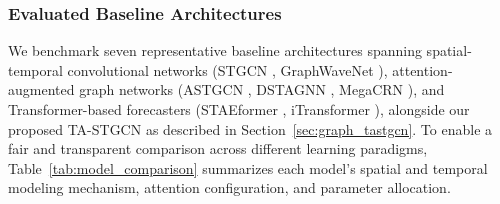 \documentclass[a4paper,fleqn]{cas-sc}
\begin{document}
\subsubsection{Evaluated Baseline Architectures}
We benchmark seven representative baseline architectures spanning spatial-temporal convolutional networks (STGCN \cite{stgcn}, GraphWaveNet \cite{wavenet}), attention-augmented graph networks (ASTGCN \cite{astgcn}, DSTAGNN \cite{dstagnn}, MegaCRN \cite{megacrn}), and Transformer-based forecasters (STAEformer \cite{staeformer}, iTransformer \cite{itransformer}), alongside our proposed TA-STGCN as described in Section~\ref{sec:graph_tastgcn}. To enable a fair and transparent comparison across different learning paradigms, Table~\ref{tab:model_comparison} summarizes each model's spatial and temporal modeling mechanism, attention configuration, and parameter allocation.
\end{document}
